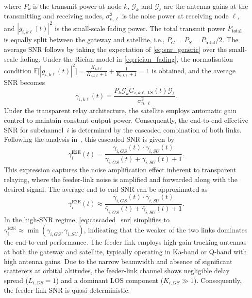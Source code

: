 \documentclass[lettersize,journal]{IEEEtran}
\begin{document}
where $P_k$ is the transmit power at node $k$, $\mathcal{G}_k$ and $\mathcal{G}_\ell$ are the antenna gains at the transmitting and receiving nodes, $\sigma_{n,\ell}^2$ is the noise power at receiving node $\ell$, and $|g_{i,k\ell}(t)|^2$ is the small-scale fading power. The total transmit power $P_{\mathrm{total}}$ is equally split between the gateway and satellite, i.e., $P_G = P_S = P_{\mathrm{total}}/2$. The average SNR follows by taking the expectation of \eqref{eq:snr_generic} over the small-scale fading. Under the Rician model in \eqref{eq:rician_fading}, the normalisation condition $
\mathbb{E}\bigl[|g_{i,k\ell}(t)|^2\bigr] 
= \frac{K_{i,k\ell}}{K_{i,k\ell}+1} + \frac{1}{K_{i,k\ell}+1} = 1
$ is obtained, and the average SNR becomes
\begin{equation}
\bar{\gamma}_{i,k\ell}(t)
= \frac{P_k \mathcal{G}_k G_{i,k\ell,\mathrm{LS}}(t) \mathcal{G}_\ell}
{\sigma_{n,\ell}^2}.
\label{eq:avg_snr_generic}
\end{equation} Under the transparent relay architecture, the satellite employs automatic gain control to maintain constant output power. Consequently, the end-to-end effective SNR for subchannel~$i$ is determined by the cascaded combination of both links. Following the analysis in~\cite{Hasna2003}, this cascaded SNR is given by
\begin{equation}
\gamma_{i}^{\mathrm{E2E}}(t) = \frac{\gamma_{i,GS}(t) \cdot \gamma_{i,SU}(t)}{\gamma_{i,GS}(t) + \gamma_{i,SU}(t) + 1}.
\label{eq:cascaded_snr}
\end{equation}
This expression captures the noise amplification effect inherent to transparent relaying, where the feeder-link noise is amplified and forwarded along with the desired signal. The average end-to-end SNR can be approximated as
\begin{equation}
\bar{\gamma}_{i}^{\mathrm{E2E}}(t) \approx \frac{\bar{\gamma}_{i,GS}(t) \cdot \bar{\gamma}_{i,SU}(t)}{\bar{\gamma}_{i,GS}(t) + \bar{\gamma}_{i,SU}(t) + 1}.
\label{eq:avg_cascaded_snr}
\end{equation}
In the high-SNR regime, \eqref{eq:cascaded_snr} simplifies to $\gamma_{i}^{\mathrm{E2E}} \approx \min(\gamma_{i,GS}, \gamma_{i,SU})$, indicating that the weaker of the two links dominates the end-to-end performance. The feeder link employs high-gain tracking antennas at both the gateway and satellite, typically operating in Ka-band or Q-band with high antenna gains. Due to the narrow beamwidth and absence of significant scatterers at orbital altitudes, the feeder-link channel shows negligible delay spread ($L_{i,GS} = 1$) and a dominant LOS component ($K_{i,GS} \gg 1$). Consequently, the feeder-link SNR is quasi-deterministic:
\end{document}
